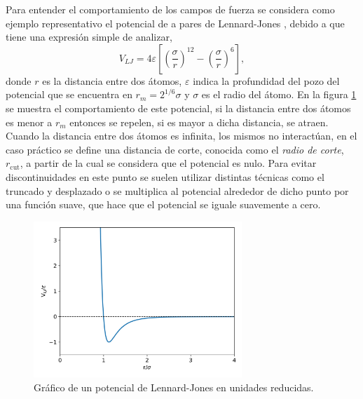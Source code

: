 Para entender el comportamiento de los campos de fuerza se considera como ejemplo 
representativo el potencial de a pares de Lennard-Jones \cite{lennard-jones}, 
debido a que tiene una expresión simple de analizar,
\begin{equation}
    V_{LJ} = 4\varepsilon \left[ \left( \frac{\sigma}{r} \right)^{12} - \left( \frac{\sigma}{r} \right)^{6} \right],
\end{equation}
donde $r$ es la distancia entre dos átomos, $\varepsilon$ indica la profundidad 
del pozo del potencial que se encuentra en $r_m = 2^{1/6} \sigma$ y $\sigma$ es el
radio del átomo. En la figura \ref{fig:lj} se muestra el comportamiento de este
potencial, si la distancia entre dos átomos es menor a $r_m$ entonces se repelen,
si es mayor a dicha distancia, se atraen. Cuando la distancia entre dos átomos es 
infinita, los mismos no interactúan, en el caso práctico se define una distancia 
de corte, conocida como el \textit{radio de corte}, $r_{\text{cut}}$, a partir de 
la cual se considera que el potencial es nulo. Para evitar discontinuidades en 
este punto se suelen utilizar distintas técnicas como el truncado y desplazado o 
se multiplica al potencial alrededor de dicho punto por una función suave, que 
hace que el potencial se iguale suavemente a cero.
\begin{figure}[h!]
    \centering
    \includegraphics[width=0.7\textwidth]{Metodos/atomicos/lj.png}
    \caption{Gráfico de un potencial de Lennard-Jones en unidades reducidas.}
    \label{fig:lj}
\end{figure}

